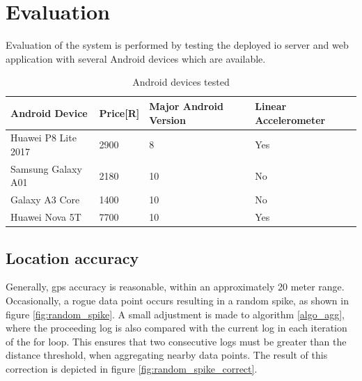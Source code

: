 \section{Evaluation}
Evaluation of the system is performed by testing the deployed \ac{io} server and web application with several Android devices which are available.

\begin{table}[H]
\caption{Android devices tested}
\label{tab:android_devices_tested}
\begin{tabular}{llll}
\hline
Android Device      & Price[R]  & Major Android Version & Linear Accelerometer \\ \hline
Huawei P8 Lite 2017 & 2900     & 8                     & Yes                  \\
Samsung Galaxy A01  & 2180     & 10                    & No                   \\
Galaxy A3 Core      & 1400     & 10                    & No                   \\
Huawei Nova 5T      & 7700     & 10                    & Yes                  \\ \hline
\end{tabular}
\end{table}

\subsection{Location accuracy}
Generally, \ac{gps} accuracy is reasonable, within an approximately 20 meter range.
Occasionally, a rogue data point occurs resulting in a random spike, as shown in figure \ref{fig:random_spike}.
A small adjustment is made to algorithm \ref{algo_agg}, where the proceeding log is also compared with the current log in each iteration of the for loop.
This ensures that two consecutive logs must be greater than the distance threshold, when aggregating nearby data points.
The result of this correction is depicted in figure \ref{fig:random_spike_correct}.

